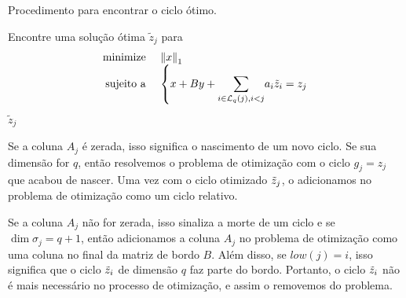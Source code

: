 \begin{algoritmo}
    \caption{Procedimento para encontrar o ciclo ótimo.}
    \label{alg:optimize}
    \begin{algorithmic}[1]
            \State Encontre uma solução ótima $\tilde{z}_j$ para
            \begin{equation}\label{eq:optimize}
                \begin{array}{rl}
                    \text{minimize } & \norm{x}_1 \\
                    \text{sujeito a } & 
                    \left\{x + By + \mathlarger{\sum}_{i \in \mathcal{L}_q(j), i < j} a_i \tilde{z}_i = z_j\right.
                \end{array}
            \end{equation}
            \State \Return $\tilde{z}_j$
        \EndProcedure
    \end{algorithmic}
\end{algoritmo}

Se a coluna $A_j$ é zerada, isso significa o nascimento de um novo ciclo. Se sua dimensão for
$q$, então resolvemos o problema de otimização com o ciclo $g_j = z_j$ que acabou de nascer. 
Uma vez com o ciclo otimizado $\tilde{z}_j$, o adicionamos no problema de otimização como um
ciclo relativo. 

Se a coluna $A_j$ não for zerada, isso sinaliza a morte de um ciclo e se $\dim \sigma_j = q + 1$,
então adicionamos a coluna $A_j$ no problema de otimização como uma coluna no final da matriz de bordo $B$.
Além disso, se $low(j) = i$, isso significa que o ciclo $\tilde{z}_i$ de dimensão $q$ faz parte do bordo. 
Portanto, o ciclo $\tilde{z}_i$ não é mais necessário no processo de otimização, e assim o removemos
do problema. 

